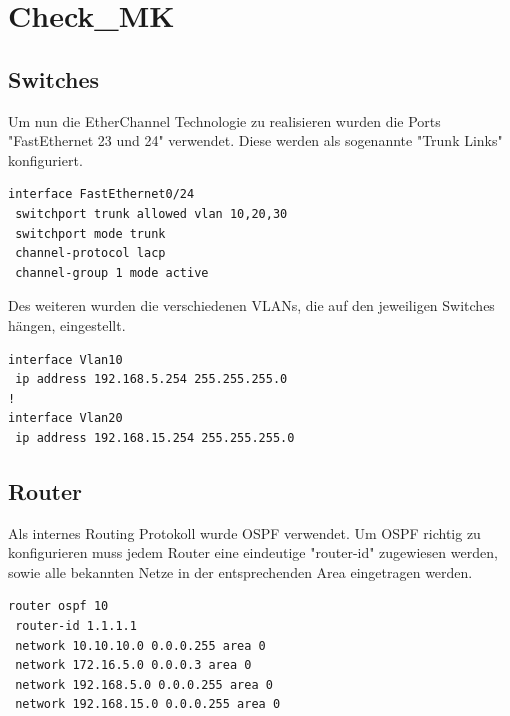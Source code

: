 \chapter{Check\_MK}
\label{checkmk}

\section{Switches}

Um nun die EtherChannel Technologie zu realisieren wurden die Ports "FastEthernet 23 und 24" verwendet. Diese werden als sogenannte "Trunk Links" konfiguriert.

\begin{lstlisting}[caption={Setting EtherChannel on a switch},label={lst:etherchannel},language={}]
interface FastEthernet0/24
 switchport trunk allowed vlan 10,20,30
 switchport mode trunk
 channel-protocol lacp
 channel-group 1 mode active
\end{lstlisting}

Des weiteren wurden die verschiedenen \ac{VLAN}s, die auf den jeweiligen Switches hängen, eingestellt.

\begin{lstlisting}[caption={VLAN Konfiguration auf Switch 1},label={lst:vlan},language={}]
interface Vlan10
 ip address 192.168.5.254 255.255.255.0
!
interface Vlan20
 ip address 192.168.15.254 255.255.255.0

\end{lstlisting}

\section{Router}

Als internes Routing Protokoll wurde \ac{OSPF} verwendet. Um \ac{OSPF} richtig zu konfigurieren muss jedem Router eine eindeutige "router-id" zugewiesen werden, sowie alle bekannten Netze in der entsprechenden Area eingetragen werden.

\begin{lstlisting}[caption={OSPF Konfiguration auf Router 1},label={lst:ospf},language={}]
router ospf 10
 router-id 1.1.1.1
 network 10.10.10.0 0.0.0.255 area 0
 network 172.16.5.0 0.0.0.3 area 0
 network 192.168.5.0 0.0.0.255 area 0
 network 192.168.15.0 0.0.0.255 area 0 
\end{lstlisting}

